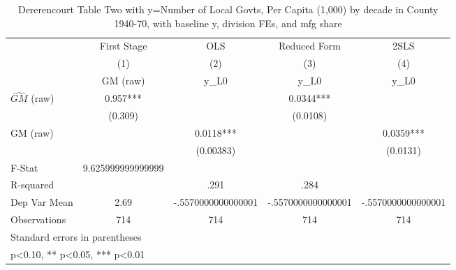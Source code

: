 \begin{table}[htbp]\centering
\def\sym#1{\ifmmode^{#1}\else\(^{#1}\)\fi}
\caption{Dererencourt Table Two with y=Number of Local Govts, Per Capita (1,000) by decade in County 1940-70, with baseline y, division FEs, and mfg share}
\begin{tabular}{l*{4}{c}}
\toprule
                    & First Stage   &         OLS   &Reduced Form   &        2SLS   \\
                    &\multicolumn{1}{c}{(1)}&\multicolumn{1}{c}{(2)}&\multicolumn{1}{c}{(3)}&\multicolumn{1}{c}{(4)}\\
                    &\multicolumn{1}{c}{GM  (raw)}&\multicolumn{1}{c}{y\_L0}&\multicolumn{1}{c}{y\_L0}&\multicolumn{1}{c}{y\_L0}\\
\midrule
$\hat{GM}$ (raw)    &       0.957***&               &      0.0344***&               \\
                    &     (0.309)   &               &    (0.0108)   &               \\
\addlinespace
GM  (raw)           &               &      0.0118***&               &      0.0359***\\
                    &               &   (0.00383)   &               &    (0.0131)   \\
\midrule
F-Stat              &9.625999999999999   &               &               &               \\
R-squared           &               &        .291   &        .284   &               \\
Dep Var Mean        &        2.69   &-.5570000000000001   &-.5570000000000001   &-.5570000000000001   \\
Observations        &         714   &         714   &         714   &         714   \\
\bottomrule
\multicolumn{5}{l}{\footnotesize Standard errors in parentheses}\\
\multicolumn{5}{l}{\footnotesize * p<0.10, ** p<0.05, *** p<0.01}\\
\end{tabular}
\end{table}
